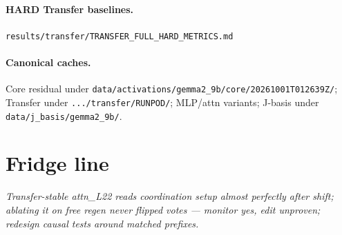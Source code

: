 \documentclass[11pt,a4paper]{article}
\begin{document}
\paragraph{HARD Transfer baselines.}
\texttt{results/transfer/TRANSFER\_FULL\_HARD\_METRICS.md}

\paragraph{Canonical caches.}
Core residual under \texttt{data/activations/gemma2\_9b/core/20261001T012639Z/}; Transfer under \texttt{.../transfer/RUNPOD/}; MLP/attn variants; J-basis under \texttt{data/j\_basis/gemma2\_9b/}.

\section{Fridge line}
\label{app:fridge}

\noindent\textit{Transfer-stable attn\_L22 reads coordination setup almost perfectly after shift; ablating it on free regen never flipped votes --- monitor yes, edit unproven; redesign causal tests around matched prefixes.}
\end{document}
